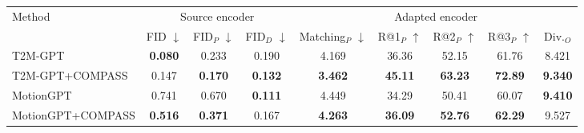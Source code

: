 \begin{tabular*}{\textwidth}{@{\extracolsep{\fill}}l*{8}{c}@{}}
\toprule
Method & \multicolumn{3}{c}{Source encoder} & \multicolumn{5}{c}{Adapted encoder} \\
\cmidrule(lr){2-4}\cmidrule(lr){5-9}
 & FID $\downarrow$ & FID$_P$ $\downarrow$ & FID$_D$ $\downarrow$ & Matching$_P$ $\downarrow$ & R@1$_P$ $\uparrow$ & R@2$_P$ $\uparrow$ & R@3$_P$ $\uparrow$ & Div.$_O$ \\
\midrule
T2M-GPT & \textbf{0.080} & 0.233 & 0.190 & 4.169 & 36.36 & 52.15 & 61.76 & 8.421 \\
T2M-GPT+COMPASS & 0.147 & \textbf{0.170} & \textbf{0.132} & \textbf{3.462} & \textbf{45.11} & \textbf{63.23} & \textbf{72.89} & \textbf{9.340} \\
\midrule
MotionGPT & 0.741 & 0.670 & \textbf{0.111} & 4.449 & 34.29 & 50.41 & 60.07 & \textbf{9.410} \\
MotionGPT+COMPASS & \textbf{0.516} & \textbf{0.371} & 0.167 & \textbf{4.263} & \textbf{36.09} & \textbf{52.76} & \textbf{62.29} & 9.527 \\
\bottomrule
\end{tabular*}
